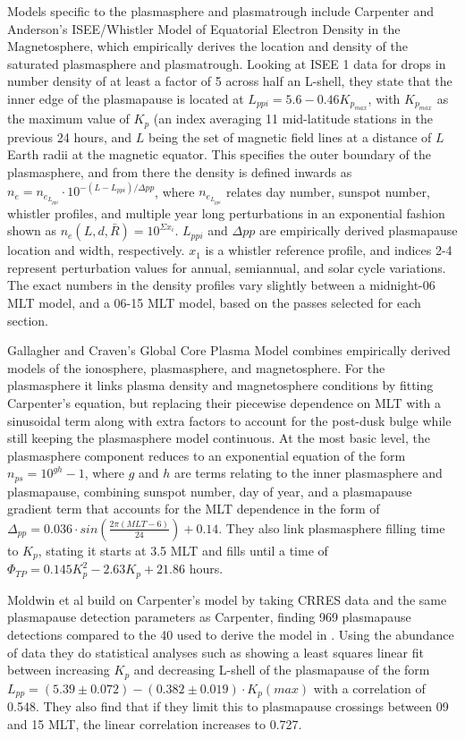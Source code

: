 Models specific to the plasmasphere and plasmatrough include Carpenter and Anderson's ISEE/Whistler Model of Equatorial Electron Density in the Magnetosphere\cite{Carpenter1992ISEEModel}, which empirically derives the location and density of the saturated plasmasphere and plasmatrough. Looking at ISEE 1 data for drops in number density of at least a factor of 5 across half an L-shell, they state that the inner edge of the plasmapause is located at $L_{ppi}=5.6-0.46K_{p_{max}}$, with $K_{p_{max}}$ as the maximum value of $K_p$ (an index averaging 11 mid-latitude stations in the previous 24 hours, and $L$ being the set of magnetic field lines at a distance of $L$ Earth radii at the magnetic equator. This specifies the outer boundary of the plasmasphere, and from there the density is defined inwards as $n_e=n_{e_{L_{ppi}}}\cdot 10^{-(L-L_{ppi})/\Delta pp}$, where $n_{e_{L_{ppi}}}$ relates day number, sunspot number, whistler profiles, and multiple year long perturbations in an exponential fashion shown as $n_e(L,d,\bar{R})=10^{\Sigma x_i}$. $L_{ppi}$ and $\Delta pp$ are empirically derived plasmapause location and width, respectively. $x_1$ is a whistler reference profile, and indices 2-4 represent perturbation values for annual, semiannual, and solar cycle variations. The exact numbers in the density profiles vary slightly between a midnight-06 MLT model, and a 06-15 MLT model, based on the passes selected for each section.

Gallagher and Craven's Global Core Plasma Model \cite{Gallagher2000GlobalCore} combines empirically derived models of the ionosphere, plasmasphere, and magnetosphere. For the plasmasphere it links plasma density and magnetosphere conditions by fitting Carpenter's equation, but replacing their piecewise dependence on MLT with a sinusoidal term along with extra factors to account for the post-dusk bulge while still keeping the plasmasphere model continuous. At the most basic level, the plasmasphere component reduces to an exponential equation of the form $n_{ps}=10^{gh}-1$, where $g$ and $h$ are terms relating to the inner plasmasphere and plasmapause, combining sunspot number, day of year, and a plasmapause gradient term that accounts for the MLT dependence in the form of $\Delta_{pp}=0.036\cdot sin(\frac{2\pi (MLT-6)}{24})+0.14$. They also link plasmasphere filling time to $K_p$, stating it starts at 3.5 MLT and fills until a time of $\Phi_{TP}=0.145K_p^2-2.63K_p+21.86$ hours. 

Moldwin et al \cite{Moldwin2002ModelPlasmapause} build on Carpenter's model by taking CRRES data and the same plasmapause detection parameters as Carpenter, finding 969 plasmapause detections compared to the 40 used to derive the model in \cite{Carpenter1992ISEEModel}. Using the abundance of data they do statistical analyses such as showing a least squares linear fit between increasing $K_p$ and decreasing L-shell of the plasmapause of the form $L_{pp}=(5.39\pm 0.072)-(0.382\pm 0.019)\cdot K_p(max)$ with a correlation of 0.548. They also find that if they limit this to plasmapause crossings between 09 and 15 MLT, the linear correlation increases to 0.727.

